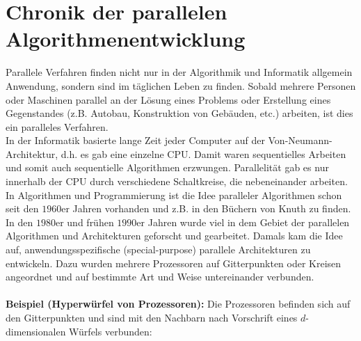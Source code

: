 \section{Chronik der parallelen Algorithmenentwicklung}
Parallele Verfahren finden nicht nur in der Algorithmik und Informatik allgemein Anwendung, sondern sind im täglichen Leben zu finden. Sobald mehrere Personen oder Maschinen parallel an der Lösung eines Problems oder Erstellung eines Gegenstandes (z.B. Autobau, Konstruktion von Gebäuden, etc.) arbeiten, ist dies ein paralleles Verfahren.\\
In der Informatik basierte lange Zeit jeder Computer auf der Von-Neumann-Architektur, d.h. es gab eine einzelne CPU. Damit waren sequentielles Arbeiten und somit auch sequentielle Algorithmen erzwungen. Parallelität gab es nur innerhalb der CPU durch verschiedene Schaltkreise, die nebeneinander arbeiten.\\
In Algorithmen und Programmierung ist die Idee paralleler Algorithmen schon seit den $1960\text{er}$ Jahren vorhanden und z.B. in den Büchern von Knuth zu finden.\\
In den $1980\text{er}$ und frühen $1990\text{er}$ Jahren wurde viel in dem Gebiet der parallelen Algorithmen und Architekturen geforscht und gearbeitet. Damals kam die Idee auf, anwendungsspezifische (special-purpose) parallele Architekturen zu entwickeln. Dazu wurden mehrere Prozessoren auf Gitterpunkten oder Kreisen angeordnet und auf bestimmte Art und Weise untereinander verbunden.\\ \\
{\bf{Beispiel (Hyperwürfel von Prozessoren):}} Die Prozessoren befinden sich auf den Gitterpunkten und sind mit den Nachbarn nach Vorschrift eines $d$-dimensionalen Würfels verbunden:
\\

